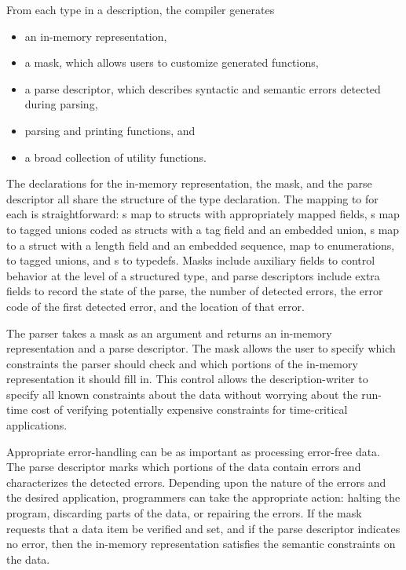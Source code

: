 From each type in a \pads{} description, the compiler generates 
\begin{itemize}
\setlength{\itemsep}{0ex plus0.2ex}
\item an in-memory representation, 
\item a mask, which allows users to customize generated functions,
\item a parse descriptor, which describes syntactic and
semantic errors detected during parsing, 
\item parsing and printing functions, and 
\item a broad collection of utility functions.
\end{itemize}
%

The \C{} declarations for the in-memory representation, the mask, 
and the parse descriptor all share the structure of the \pads{}
type declaration.  The mapping to \C{} for each is straightforward: 
s map to \C{} structs with appropriately mapped fields, 
s map to tagged unions coded as \C{} structs with a tag field 
and an embedded 
union, s map to a \C{} struct with a length field and an 
embedded sequence,  map to \C{} enumerations,  
to tagged unions, and s to \C{} typedefs.  Masks include
auxiliary fields to control behavior at the level of a structured
type, and parse descriptors include extra fields to record the 
state of the parse, the number of detected errors, 
the error code of the first detected error, and the location of that error.

The parser takes a mask as an argument and returns an
in-memory representation and a parse descriptor.  
The mask allows the user to specify 
which constraints the parser should check and which portions of the
in-memory representation it should fill in.  This control allows the
description-writer to specify all known constraints about the data
without worrying about the run-time cost of verifying potentially
expensive constraints for time-critical applications.

Appropriate error-handling can be as important as processing
error-free data.  The parse descriptor marks which portions of the
data contain errors and characterizes the detected errors.
Depending upon the nature of the errors and the desired application,
programmers can take the appropriate action: halting the program,
discarding parts of the data, or repairing the errors.
If the mask requests
that a data item be verified and set, and if the parse descriptor
indicates no error, then the in-memory representation satisfies the
semantic constraints on the data.

